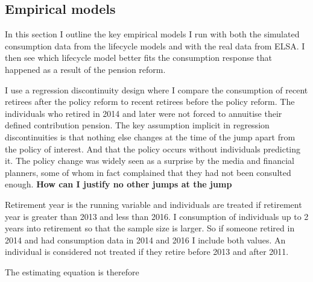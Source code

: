 \documentclass[12pt]{article}
\begin{document}
\subsection{Empirical models}

In this section I outline the key empirical models I run with both the simulated consumption data from the
lifecycle models and with the real data from ELSA. I then see which lifecycle model better fits the consumption
response that happened as a result of the pension reform.

I use a regression discontinuity design where I compare the consumption of recent retirees after the policy reform
to recent retirees before the policy reform. The individuals who retired in 2014 and later were not forced to
annuitise their defined contribution pension. The key assumption implicit in regression discontinuities is
that nothing else changes at the time of the jump apart from the policy of interest. And that the policy occurs
without individuals predicting it. The policy change was widely seen as a surprise by the media and financial planners,
some of whom in fact complained that they had not been consulted enough. \textbf{How can I justify no other jumps at the jump}

Retirement year is the running variable and individuals are treated if retirement year is greater than 2013 and less than 2016.
I consumption of individuals up to 2 years into retirement so that the sample size is larger. So if someone retired in 2014 and
had consumption data in 2014 and 2016 I include both values. An individual is considered not treated if they retire before 2013 and after 2011.


The estimating equation is therefore
\end{document}
